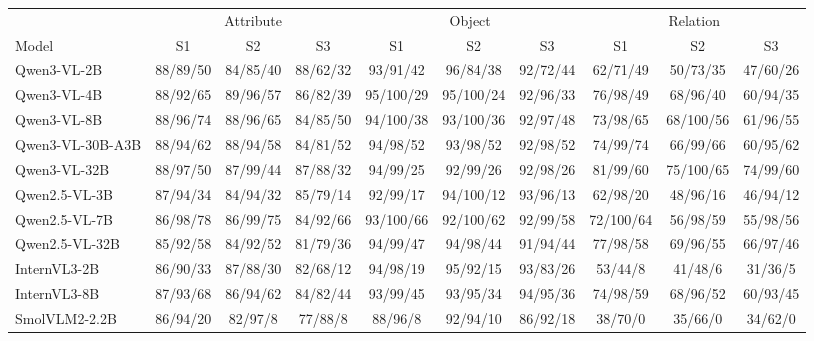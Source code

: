 \begin{tabular}{lccccccccc}
\toprule
 & \multicolumn{3}{c}{Attribute} & \multicolumn{3}{c}{Object} & \multicolumn{3}{c}{Relation} \\
\cmidrule(lr){2-4}\cmidrule(lr){5-7}\cmidrule(lr){8-10}
Model & S1 & S2 & S3 & S1 & S2 & S3 & S1 & S2 & S3 \\
\midrule
Qwen3-VL-2B & 88/89/50 & 84/85/40 & 88/62/32 & 93/91/42 & 96/84/38 & 92/72/44 & 62/71/49 & 50/73/35 & 47/60/26 \\
Qwen3-VL-4B & 88/92/65 & 89/96/57 & 86/82/39 & 95/100/29 & 95/100/24 & 92/96/33 & 76/98/49 & 68/96/40 & 60/94/35 \\
Qwen3-VL-8B & 88/96/74 & 88/96/65 & 84/85/50 & 94/100/38 & 93/100/36 & 92/97/48 & 73/98/65 & 68/100/56 & 61/96/55 \\
Qwen3-VL-30B-A3B & 88/94/62 & 88/94/58 & 84/81/52 & 94/98/52 & 93/98/52 & 92/98/52 & 74/99/74 & 66/99/66 & 60/95/62 \\
Qwen3-VL-32B & 88/97/50 & 87/99/44 & 87/88/32 & 94/99/25 & 92/99/26 & 92/98/26 & 81/99/60 & 75/100/65 & 74/99/60 \\
\midrule
Qwen2.5-VL-3B & 87/94/34 & 84/94/32 & 85/79/14 & 92/99/17 & 94/100/12 & 93/96/13 & 62/98/20 & 48/96/16 & 46/94/12 \\
Qwen2.5-VL-7B & 86/98/78 & 86/99/75 & 84/92/66 & 93/100/66 & 92/100/62 & 92/99/58 & 72/100/64 & 56/98/59 & 55/98/56 \\
Qwen2.5-VL-32B & 85/92/58 & 84/92/52 & 81/79/36 & 94/99/47 & 94/98/44 & 91/94/44 & 77/98/58 & 69/96/55 & 66/97/46 \\
\midrule
InternVL3-2B & 86/90/33 & 87/88/30 & 82/68/12 & 94/98/19 & 95/92/15 & 93/83/26 & 53/44/8 & 41/48/6 & 31/36/5 \\
InternVL3-8B & 87/93/68 & 86/94/62 & 84/82/44 & 93/99/45 & 93/95/34 & 94/95/36 & 74/98/59 & 68/96/52 & 60/93/45 \\
\midrule
SmolVLM2-2.2B & 86/94/20 & 82/97/8 & 77/88/8 & 88/96/8 & 92/94/10 & 86/92/18 & 38/70/0 & 35/66/0 & 34/62/0 \\
\bottomrule
\end{tabular}
